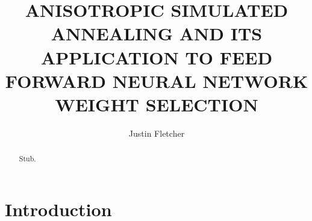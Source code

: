 \documentclass[11pt]{afthesis}
\author{Justin Fletcher}
\title{ANISOTROPIC SIMULATED ANNEALING AND ITS APPLICATION TO FEED FORWARD NEURAL NETWORK WEIGHT SELECTION}
\begin{document}
	
	
	\flyleaf      			%
	
	\disclaimerpage                 %
	
	\titlepage			%
	
	\approvalpage                   %
	
	\begin{preface}
	\end{preface}
	
	\tableofcontents	%
	
	\listoffigures  	%
	\listoftables		%
	\listofsymbols      %
	
	\listofabbreviations
	
	
	\begin{abstract}
		Stub.
	\end{abstract}
	
	
	\chapter{Introduction}
	
\end{document}
